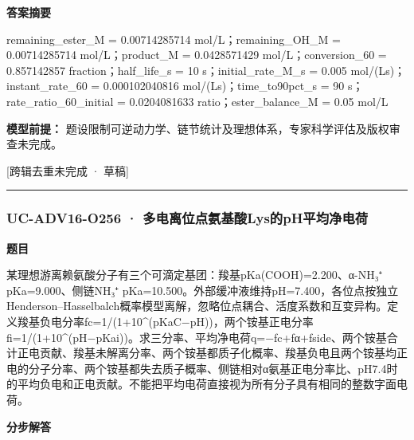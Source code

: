 \documentclass[UTF8,11pt,a4paper]{ctexart}
\begin{document}
\noindent\textbf{答案摘要}\par
remaining\_ester\_M = 0.00714285714 mol/L；remaining\_OH\_M = 0.00714285714 mol/L；product\_M = 0.0428571429 mol/L；conversion\_60 = 0.857142857 fraction；half\_life\_s = 10 s；initial\_rate\_M\_s = 0.005 mol/(Ls)；instant\_rate\_60 = 0.000102040816 mol/(Ls)；time\_to90pct\_s = 90 s；rate\_ratio\_60\_initial = 0.0204081633 ratio；ester\_balance\_M = 0.05 mol/L\par
\noindent\textbf{模型前提：}
题设限制可逆动力学、链节统计及理想体系，专家科学评估及版权审查未完成。\par
\noindent\textcolor{red!65!black}{[跨辑去重未完成 · 草稿]} \par
\medskip\hrule\medskip
{}
\subsubsection*{UC-ADV16-O256 · 多电离位点氨基酸Lys的pH平均净电荷}
\noindent\textbf{题目}\par
某理想游离赖氨酸分子有三个可滴定基团：羧基pKa(COOH)=2.200、α-NH₃⁺ pKa=9.000、侧链NH₃⁺ pKa=10.500。外部缓冲液维持pH=7.400，各位点按独立Henderson–Hasselbalch概率模型离解，忽略位点耦合、活度系数和互变异构。定义羧基负电分率fc=1/(1+10\textasciicircum{}(pKaC−pH))，两个铵基正电分率fi=1/(1+10\textasciicircum{}(pH−pKai))。求三分率、平均净电荷q=−fc+fα+fside、两个铵基合计正电贡献、羧基未解离分率、两个铵基都质子化概率、羧基负电且两个铵基均正电的分子分率、两个铵基都失去质子概率、侧链相对α氨基正电分率比、pH7.4时的平均负电和正电贡献。不能把平均电荷直接视为所有分子具有相同的整数字面电荷。\par
\medskip\noindent\textbf{分步解答}
\end{document}
